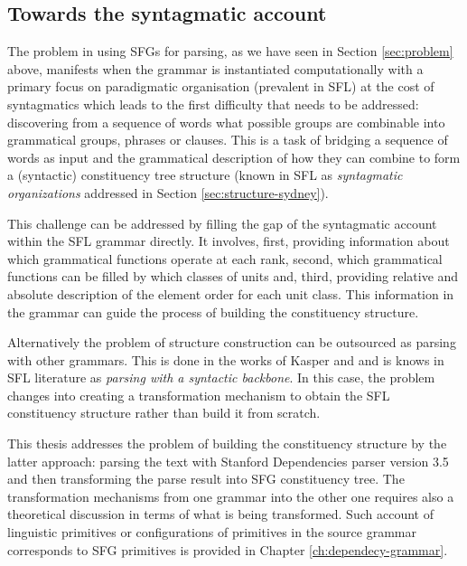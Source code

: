 \subsection{Towards the syntagmatic account}
The problem in using SFGs for parsing, as we have seen in Section \ref{sec:problem} above, manifests when the grammar is instantiated computationally with a primary focus on paradigmatic organisation (prevalent in SFL) at the cost of syntagmatics which leads to the first difficulty that needs to be addressed: discovering from a sequence of words what possible groups are combinable into grammatical groups, phrases or clauses. This is a task of bridging a sequence of words as input and the grammatical description of how they can combine to form a (syntactic) constituency tree structure (known in SFL as \textit{syntagmatic organizations} addressed in Section \ref{sec:structure-sydney}). 

This challenge can be addressed by filling the gap of the syntagmatic account within the SFL grammar directly. It involves, first, providing information about which grammatical functions operate at each rank, second, which grammatical functions can be filled by which classes of units and, third, providing relative and absolute description of the element order for each unit class. This information in the grammar can guide the process of building the constituency structure. 

Alternatively the problem of structure construction can be outsourced as parsing with other grammars. This is done in the works of Kasper \citet{Kasper1988} and \citet{Honnibal2004a, Honnibal2007} and is knows in SFL literature as \textit{parsing with a syntactic backbone}. In this case, the problem changes into creating a transformation mechanism to obtain the SFL constituency structure rather than build it from scratch. 


This thesis addresses the problem of building the constituency structure by the latter approach: parsing the text with Stanford Dependencies parser version 3.5 \citep{Marneffe2008a,Marneffe2008, Marneffe2014} and then transforming the parse result into SFG constituency tree. The transformation mechanisms from one grammar into the other one requires also a theoretical discussion in terms of what is being transformed. Such account of linguistic primitives or configurations of primitives in the source grammar corresponds to SFG primitives is provided in Chapter \ref{ch:dependecy-grammar}. 

